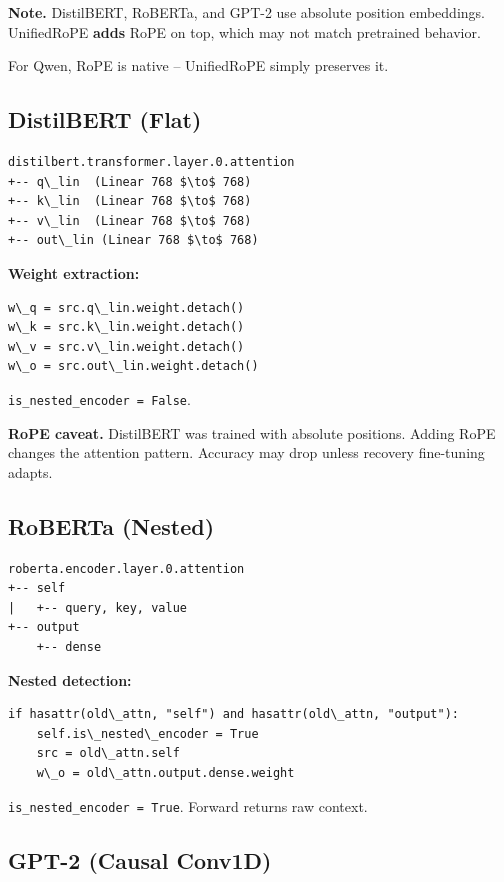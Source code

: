 \textbf{Note.} DistilBERT, RoBERTa, and GPT-2 use absolute position embeddings. 
UnifiedRoPE \textbf{adds} RoPE on top, which may not match pretrained behavior.

For Qwen, RoPE is native -- UnifiedRoPE simply preserves it.

\subsection{DistilBERT (Flat)}

\begin{lstlisting}
distilbert.transformer.layer.0.attention
+-- q\_lin  (Linear 768 $\to$ 768)
+-- k\_lin  (Linear 768 $\to$ 768)
+-- v\_lin  (Linear 768 $\to$ 768)
+-- out\_lin (Linear 768 $\to$ 768)
\end{lstlisting}

\textbf{Weight extraction:}
\begin{lstlisting}
w\_q = src.q\_lin.weight.detach()
w\_k = src.k\_lin.weight.detach()
w\_v = src.v\_lin.weight.detach()
w\_o = src.out\_lin.weight.detach()
\end{lstlisting}

\texttt{is\_nested\_encoder = False}.

\textbf{RoPE caveat.} DistilBERT was trained with absolute positions. Adding 
RoPE changes the attention pattern. Accuracy may drop unless recovery 
fine-tuning adapts.

\subsection{RoBERTa (Nested)}

\begin{lstlisting}
roberta.encoder.layer.0.attention
+-- self
|   +-- query, key, value
+-- output
    +-- dense
\end{lstlisting}

\textbf{Nested detection:}
\begin{lstlisting}
if hasattr(old\_attn, "self") and hasattr(old\_attn, "output"):
    self.is\_nested\_encoder = True
    src = old\_attn.self
    w\_o = old\_attn.output.dense.weight
\end{lstlisting}

\texttt{is\_nested\_encoder = True}. Forward returns raw context.

\subsection{GPT-2 (Causal Conv1D)}

